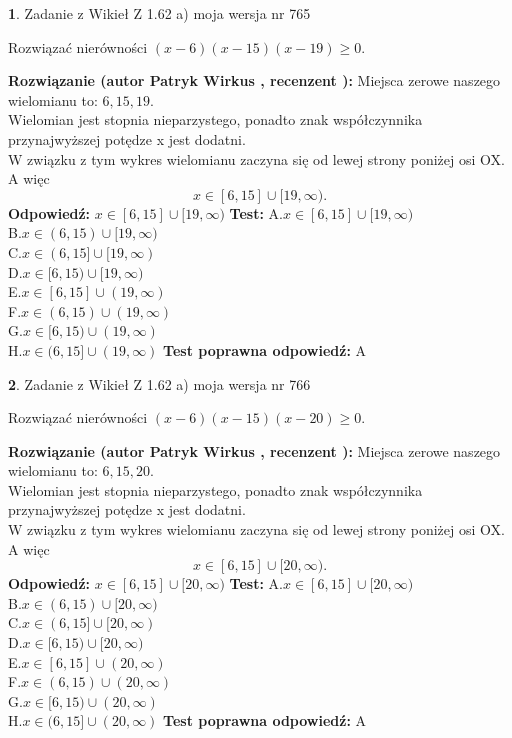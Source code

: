 \documentclass[12pt, a4paper]{article}
\theoremstyle{definition} %
\newtheorem{zad}{}
\newcommand{\zadStart}[1]{\begin{zad}#1\newline}
\newcommand{\zadStop}{\end{zad}}
\newcommand{\rozwStart}[2]{\noindent \textbf{Rozwiązanie (autor #1 , recenzent #2): }\newline}
\newcommand{\rozwStop}{\newline}
\newcommand{\odpStart}{\noindent \textbf{Odpowiedź:}\newline}
\newcommand{\odpStop}{\newline}
\newcommand{\testStart}{\noindent \textbf{Test:}\newline}
\newcommand{\testStop}{\newline}
\newcommand{\kluczStart}{\noindent \textbf{Test poprawna odpowiedź:}\newline}
\newcommand{\kluczStop}{\newline}
\begin{document}
\zadStart{Zadanie z Wikieł Z 1.62 a) moja wersja nr 765}

Rozwiązać nierówności $(x-6)(x-15)(x-19)\ge0$.
\zadStop
\rozwStart{Patryk Wirkus}{}
Miejsca zerowe naszego wielomianu to: $6, 15, 19$.\\
Wielomian jest stopnia nieparzystego, ponadto znak współczynnika przy\linebreak najwyższej potędze x jest dodatni.\\ W związku z tym wykres wielomianu zaczyna się od lewej strony poniżej osi OX. A więc $$x \in [6,15] \cup [19,\infty).$$
\rozwStop
\odpStart
$x \in [6,15] \cup [19,\infty)$
\odpStop
\testStart
A.$x \in [6,15] \cup [19,\infty)$\\
B.$x \in (6,15) \cup [19,\infty)$\\
C.$x \in (6,15] \cup [19,\infty)$\\
D.$x \in [6,15) \cup [19,\infty)$\\
E.$x \in [6,15] \cup (19,\infty)$\\
F.$x \in (6,15) \cup (19,\infty)$\\
G.$x \in [6,15) \cup (19,\infty)$\\
H.$x \in (6,15] \cup (19,\infty)$
\testStop
\kluczStart
A
\kluczStop



\zadStart{Zadanie z Wikieł Z 1.62 a) moja wersja nr 766}

Rozwiązać nierówności $(x-6)(x-15)(x-20)\ge0$.
\zadStop
\rozwStart{Patryk Wirkus}{}
Miejsca zerowe naszego wielomianu to: $6, 15, 20$.\\
Wielomian jest stopnia nieparzystego, ponadto znak współczynnika przy\linebreak najwyższej potędze x jest dodatni.\\ W związku z tym wykres wielomianu zaczyna się od lewej strony poniżej osi OX. A więc $$x \in [6,15] \cup [20,\infty).$$
\rozwStop
\odpStart
$x \in [6,15] \cup [20,\infty)$
\odpStop
\testStart
A.$x \in [6,15] \cup [20,\infty)$\\
B.$x \in (6,15) \cup [20,\infty)$\\
C.$x \in (6,15] \cup [20,\infty)$\\
D.$x \in [6,15) \cup [20,\infty)$\\
E.$x \in [6,15] \cup (20,\infty)$\\
F.$x \in (6,15) \cup (20,\infty)$\\
G.$x \in [6,15) \cup (20,\infty)$\\
H.$x \in (6,15] \cup (20,\infty)$
\testStop
\kluczStart
A
\kluczStop
\end{document}
